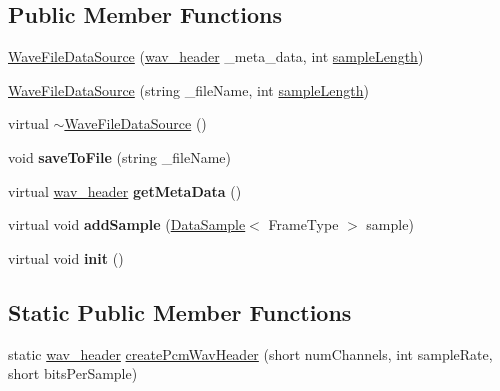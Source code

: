 \subsection*{Public Member Functions}
\begin{DoxyCompactItemize}
\item 
\hyperlink{classspeech_1_1raw__data_1_1WaveFileDataSource_a9e8c4f283e57e77fbfb7d8e4c8112d92}{Wave\+File\+Data\+Source} (\hyperlink{structspeech_1_1raw__data_1_1wav__header}{wav\+\_\+header} \+\_\+meta\+\_\+data, int \hyperlink{classspeech_1_1raw__data_1_1DataSource_a6041f72109ebba9e84e49d71f626b8ea}{sample\+Length})
\item 
\hyperlink{classspeech_1_1raw__data_1_1WaveFileDataSource_afd6dc224baa81131e0b09c18ecd42b07}{Wave\+File\+Data\+Source} (string \+\_\+file\+Name, int \hyperlink{classspeech_1_1raw__data_1_1DataSource_a6041f72109ebba9e84e49d71f626b8ea}{sample\+Length})
\item 
virtual \hyperlink{classspeech_1_1raw__data_1_1WaveFileDataSource_ace75bc6dfeb280651d4eaba46edfa922}{$\sim$\+Wave\+File\+Data\+Source} ()
\item 
\hypertarget{classspeech_1_1raw__data_1_1WaveFileDataSource_a62e606a02c1c1068c39cf56979d5943f}{void {\bfseries save\+To\+File} (string \+\_\+file\+Name)}\label{classspeech_1_1raw__data_1_1WaveFileDataSource_a62e606a02c1c1068c39cf56979d5943f}

\item 
\hypertarget{classspeech_1_1raw__data_1_1WaveFileDataSource_a2dca62bfd4d14b853400269a70d5dd0d}{virtual \hyperlink{structspeech_1_1raw__data_1_1wav__header}{wav\+\_\+header} {\bfseries get\+Meta\+Data} ()}\label{classspeech_1_1raw__data_1_1WaveFileDataSource_a2dca62bfd4d14b853400269a70d5dd0d}

\item 
\hypertarget{classspeech_1_1raw__data_1_1WaveFileDataSource_aa89989745215224ceda8c39fe23d6751}{virtual void {\bfseries add\+Sample} (\hyperlink{classspeech_1_1raw__data_1_1DataSample}{Data\+Sample}$<$ Frame\+Type $>$ sample)}\label{classspeech_1_1raw__data_1_1WaveFileDataSource_aa89989745215224ceda8c39fe23d6751}

\item 
\hypertarget{classspeech_1_1raw__data_1_1WaveFileDataSource_a79006acac0a4e1136ef140802e1c2c4d}{virtual void {\bfseries init} ()}\label{classspeech_1_1raw__data_1_1WaveFileDataSource_a79006acac0a4e1136ef140802e1c2c4d}

\end{DoxyCompactItemize}
\subsection*{Static Public Member Functions}
\begin{DoxyCompactItemize}
\item 
static \hyperlink{structspeech_1_1raw__data_1_1wav__header}{wav\+\_\+header} \hyperlink{classspeech_1_1raw__data_1_1WaveFileDataSource_a473179ee3ccc9999017c87928df2a3a6}{create\+Pcm\+Wav\+Header} (short num\+Channels, int sample\+Rate, short bits\+Per\+Sample)
\end{DoxyCompactItemize}
